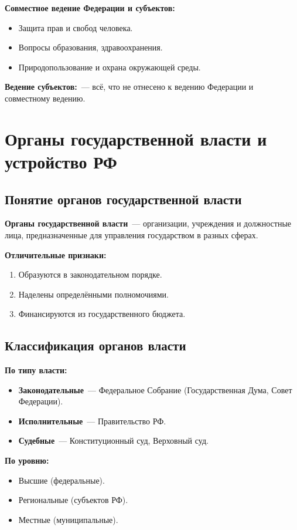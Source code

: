 \documentclass[12pt]{article}
\begin{document}
	\noindent \textbf{Совместное ведение Федерации и субъектов:}
	\begin{itemize}
		\item Защита прав и свобод человека.
		\item Вопросы образования, здравоохранения.
		\item Природопользование и охрана окружающей среды.
	\end{itemize}
	
	\noindent \textbf{Ведение субъектов:}~--- всё, что не отнесено к ведению Федерации и совместному ведению.
	
	\section{Органы государственной власти и устройство РФ}
	
	\subsection{Понятие органов государственной власти}
	
	\textbf{Органы государственной власти}~--- организации, учреждения и должностные лица, предназначенные для управления государством в разных сферах.
	
	\noindent \textbf{Отличительные признаки:}
	\begin{enumerate}
		\item Образуются в законодательном порядке.
		\item Наделены определёнными полномочиями.
		\item Финансируются из государственного бюджета.
	\end{enumerate}
	
	\subsection{Классификация органов власти}
	
	\textbf{По типу власти:}
	\begin{itemize}
		\item \textbf{Законодательные}~--- Федеральное Собрание (Государственная Дума, Совет Федерации).
		\item \textbf{Исполнительные}~--- Правительство РФ.
		\item \textbf{Судебные}~--- Конституционный суд, Верховный суд.
	\end{itemize}
	
	\noindent \textbf{По уровню:}
	\begin{itemize}
		\item Высшие (федеральные).
		\item Региональные (субъектов РФ).
		\item Местные (муниципальные).
	\end{itemize}
	
\end{document}
